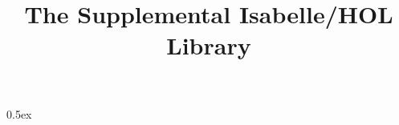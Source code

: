 \documentclass[11pt,a4paper]{article}
\begin{document}
\title{The Supplemental Isabelle/HOL Library}
\author{}
\maketitle

\tableofcontents
\newpage

\renewcommand{\isamarkupheader}[1]%
{\section{\isabellecontext: #1}\markright{THEORY~``\isabellecontext''}}
\renewcommand{\isasymguillemotright}{$\gg$}

\parindent 0pt \parskip 0.5ex


\pagestyle{headings}


\end{document}
